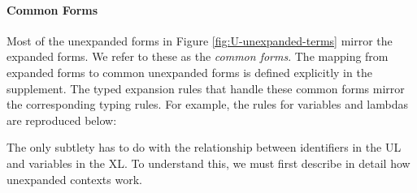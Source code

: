 \documentclass[acmlarge,review,anonymous]{acmart}\settopmatter{printfolios=true}
\begin{document}

\paragraph{Common Forms} Most of the unexpanded forms in Figure \ref{fig:U-unexpanded-terms}  mirror the expanded forms. We refer to these as the \emph{common forms}. The mapping from expanded forms to common unexpanded forms is defined explicitly in the supplement. 
The typed expansion rules that handle these common forms mirror the corresponding typing rules. For example, the rules for variables and lambdas are reproduced below:
\begin{mathpar}

\end{mathpar}

The only subtlety has to do with the relationship between identifiers in the UL and variables in the XL. To understand this, we must first describe in detail how unexpanded contexts work.
\end{document}
